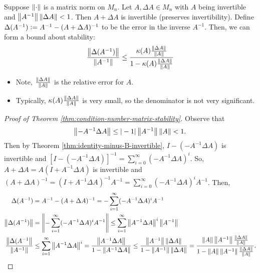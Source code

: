 \begin{theorem}
\label{thm:condition-number-matrix-stability}
Suppose $\left\lVert\cdot\right\rVert$ is a matrix norm on $M_n$. Let $A, \Delta A \in M_n$ with $A$ being invertible and $\left\lVert A^{-1}\right\rVert\left\lVert\Delta A\right\rVert < 1$. Then $A + \Delta A$ is invertible (preserves invertibility). Define $\Delta(A^{-1}) \vcentcolon= A^{-1} - (A+\Delta A)^{-1}$ to be the error in the inverse $A^{-1}$. Then, we can form a bound about stability:
\[
    \frac{\left\lVert\Delta(A^{-1})\right\rVert}{\left\lVert A^{-1}\right\rVert} \le \frac{\kappa(A) \frac{\left\lVert\Delta A\right\rVert}{\left\lVert A\right\rVert}}{1-\kappa(A)\frac{\left\lVert\Delta A\right\rVert}{\left\lVert A\right\rVert}}
\]
\begin{itemize}
    \item Note, $\frac{\left\lVert\Delta A\right\rVert}{\left\lVert A\right\rVert}$ is the relative error for $A$.
    \item Typically, $\kappa(A) \frac{\left\lVert\Delta A\right\rVert}{\left\lVert A\right\rVert}$ is very small, so the denominator is not very significant.
\end{itemize}
\end{theorem}
\begin{proof}[Proof of Theorem \ref{thm:condition-number-matrix-stability}]
Observe that
\[
    \left\lVert-A^{-1}\Delta A\right\rVert \le |-1| \left\lVert A^{-1}\right\rVert\left\lVert A\right\rVert < 1.
\]
Then by Theorem \ref{thm:identity-minus-B-invertible}, $I - (-A^{-1}\Delta A)$ is invertible and $[I - (-A^{-1}\Delta A)]^{-1} = \sum_{i=0}^\infty\left(-A^{-1}\Delta A\right)^i$. So, $A + \Delta A = A(I + A^{-1}\Delta A)$ is invertible and $(A+\Delta A)^{-1} = (I + A^{-1}\Delta A)^{-1} A^{-1} = \sum_{i=0}^\infty (-A^{-1}\Delta A)^iA^{-1}$. Then,
\begin{align*}
    \Delta(A^{-1}) &= A^{-1} - (A+\Delta A)^{-1} = -\sum_{i=1}^\infty(-A^{-1}\Delta A)^i A^{-1} \\
    \left\lVert\Delta(A^{-1})\right\rVert &= \left\lVert-\sum_{i=1}^\infty(-A^{-1}\Delta A)^i A^{-1}\right\rVert \le \sum_{i=1}^{\infty}\left\lVert A^{-1}\Delta A\right\rVert^i \left\lVert A^{-1}\right\rVert \\
    \frac{\left\lVert\Delta(A^{-1}\right\rVert}{\left\lVert A^{-1}\right\rVert} &\le \sum_{i=1}^\infty \left\lVert A^{-1}\Delta A\right\rVert^i = \frac{\left\lVert A^{-1}\Delta A\right\rVert}{1 - \left\lVert A^{-1}\Delta A\right\rVert} \le \frac{\left\lVert A^{-1}\right\rVert\left\lVert\Delta A\right\rVert}{1 - \left\lVert A^{-1}\right\rVert\left\lVert\Delta A\right\rVert} = \frac{\left\lVert A\right\rVert\left\lVert A^{-1}\right\rVert\frac{\left\lVert\Delta A\right\rVert}{\left\lVert A\right\rVert}}{1 - \left\lVert A\right\rVert\left\lVert A^{-1}\right\rVert\frac{\left\lVert\Delta A\right\rVert}{\left\lVert A\right\rVert}}.
\end{align*}
\end{proof}

